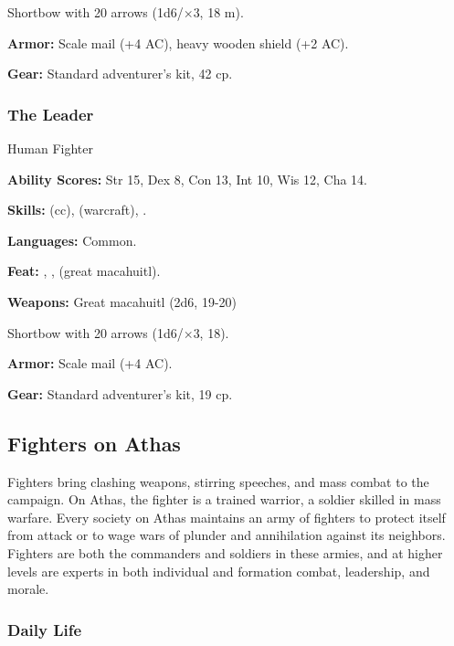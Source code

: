 Shortbow with 20 arrows (1d6/$\times$3, 18 m).

\textbf{Armor:} Scale mail (+4 AC), heavy wooden shield (+2 AC).

\textbf{Gear:} Standard adventurer's kit, 42 cp.

\subsubsection{The Leader}
Human Fighter

\textbf{Ability Scores:} Str 15, Dex 8, Con 13, Int 10, Wis 12, Cha 14.

\textbf{Skills:}  (cc),  (warcraft), .

\textbf{Languages:} Common.

\textbf{Feat:} , ,  (great macahuitl).

\textbf{Weapons:} Great macahuitl (2d6, 19-20)

Shortbow with 20 arrows (1d6/$\times$3, 18).

\textbf{Armor:} Scale mail (+4 AC).

\textbf{Gear:} Standard adventurer's kit, 19 cp.

\subsection{Fighters on Athas}

Fighters bring clashing weapons, stirring speeches, and mass combat to the campaign. On Athas, the fighter is a trained warrior, a soldier skilled in mass warfare. Every society on Athas maintains an army of fighters to protect itself from attack or to wage wars of plunder and annihilation against its neighbors. Fighters are both the commanders and soldiers in these armies, and at higher levels are experts in both individual and formation combat, leadership, and morale.

\subsubsection{Daily Life}


